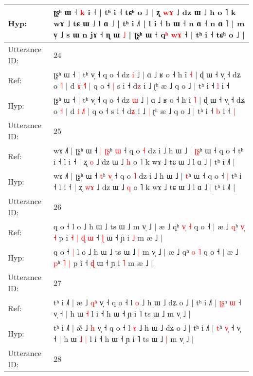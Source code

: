 \documentclass[10pt]{article}
\DeclareRobustCommand{\hl}[1]{{\textcolor{red}{#1}}}
\begin{document}
\begin{longtable}{ll}
 \\
Hyp: & ʈʂʰ ɯ ˧ \hl{k} i ˧ | tʰ i ˧ tɕʰ o ˩ | ʐ \hl{w}\hl{ɤ} ˩ dz ɯ ˩ h o ˥ k wɤ ˩ tɕ ɯ ˩ l ɑ ˩ | tʰ i ˩˥ | l i ˧ h ɯ ˧ n ɑ ˧ n ɑ ˥ | m v̩ ˩ s ɯ\hl{}\hl{} n jɤ ˧ ɳ ɯ \hl{˩} | ʈʂʰ ɯ ˧ q\hl{ʰ} \hl{w}\hl{ɤ} ˧ | tʰ i ˧ tɕʰ o ˩ |
 \\
\midrule
Utterance ID: & 24 \\
Ref: & ʈʂʰ ɯ ˧ | tʰ v̩ ˧ q o ˧ dz \hl{i} ˩ | ɑ ˩ ʁ o ˧ h ĩ \hl{˧} | ɖ ɯ ˧ v̩ ˧ dʑ o \hl{˥} | d \hl{ɤ} \hl{˧}˥ | q o ˧\hl{ }\hl{|} s i ˧ d\hl{z} i ˩\hl{}\hl{} ʈʰ æ ˩ q o ˩ | tʰ i ˧ \hl{l} i ˧\hl{}\hl{}
 \\
Hyp: & ʈʂʰ ɯ ˧ | tʰ v̩ ˧ q o ˧ dz \hl{ɯ} ˩ | ɑ ˩ ʁ o ˧ h ĩ \hl{˥} | ɖ ɯ ˧ v̩ ˧ dʑ o \hl{˧} | d \hl{i} \hl{˩}˥ | q o ˧\hl{}\hl{} s i ˧ d\hl{ʑ} i ˩\hl{ }\hl{|} ʈʰ æ ˩ q o ˩ | tʰ i ˧ \hl{b} i ˧\hl{ }\hl{|}
 \\
\midrule
Utterance ID: & 25 \\
Ref: & wɤ ˩˥ | ʈʂʰ ɯ ˧\hl{ }\hl{|} \hl{ʈ}\hl{ʂ}ʰ \hl{}\hl{ɯ} ˧ q o \hl{˧} dz i ˩ h ɯ ˩ | \hl{ʈ}\hl{ʂ}ʰ ɯ ˧ q o ˧\hl{}\hl{} tʰ i ˧ l i ˧ | ʐ \hl{}\hl{o} ˩ dz ɯ ˩ \hl{h} o ˥ k wɤ ˩ tɕ ɯ ˩ l ɑ ˩ | tʰ i ˩˥ |
 \\
Hyp: & wɤ ˩˥ | ʈʂʰ ɯ ˧\hl{}\hl{} \hl{}\hl{t}ʰ \hl{v}\hl{̩} ˧ q o \hl{˥} dz i ˩ h ɯ ˩ | \hl{}\hl{t}ʰ ɯ ˧ q o ˧\hl{ }\hl{|} tʰ i ˧ l i ˧ | ʐ \hl{w}\hl{ɤ} ˩ dz ɯ ˩ \hl{q} o ˥ k wɤ ˩ tɕ ɯ ˩ l ɑ ˩ | tʰ i ˩˥ |
 \\
\midrule
Utterance ID: & 26 \\
Ref: & q o ˧\hl{}\hl{} l o ˩ h ɯ ˩ ts ɯ ˩\hl{}\hl{} m v̩ ˩ | æ ˩ qʰ \hl{v}\hl{̩} \hl{˧} q o ˧ | æ ˩ \hl{q}ʰ \hl{v}\hl{̩} \hl{˧} p i\hl{ }\hl{˧}\hl{ }\hl{|}\hl{ }\hl{ɖ}\hl{ }\hl{ɯ} ˧ \hl{ɭ} ɯ ˧ ɲ i \hl{˩} m æ ˩ |
 \\
Hyp: & q o ˧\hl{ }\hl{|} l o ˩ h ɯ ˩ ts ɯ ˩\hl{ }\hl{|} m v̩ ˩ | æ ˩ qʰ \hl{}\hl{o} \hl{˥} q o ˧ | æ ˩ \hl{p}ʰ \hl{}\hl{˥} \hl{|} p i\hl{}\hl{}\hl{}\hl{}\hl{}\hl{}\hl{}\hl{̃} ˧ \hl{ɖ} ɯ ˧ ɲ i \hl{˥} m æ ˩ |
 \\
\midrule
Utterance ID: & 27 \\
Ref: & tʰ i ˩˥ | æ\hl{} ˩ \hl{q}\hl{ʰ} v̩ ˧ q o ˧ l \hl{o} ˩ h ɯ ˩ dʑ o ˩ | tʰ i ˩˥ | \hl{ʈ}\hl{ʂ}ʰ \hl{}\hl{ɯ} ˧ v̩ ˧ | h ɯ\hl{}\hl{} \hl{˧} l i ˧ h ɯ ˧ ɲ i ˥ ts ɯ ˩\hl{}\hl{} m v̩ ˩ |
 \\
Hyp: & tʰ i ˩˥ | æ\hl{̃} ˩ \hl{}\hl{h} v̩ ˧ q o ˧ l \hl{ɤ} ˩ h ɯ ˩ dʑ o ˩ | tʰ i ˩˥ | \hl{}\hl{t}ʰ \hl{v}\hl{̩} ˧ v̩ ˧ | h ɯ\hl{ }\hl{˩} \hl{|} l i ˧ h ɯ ˧ ɲ i ˥ ts ɯ ˩\hl{ }\hl{|} m v̩ ˩ |
 \\
\midrule
Utterance ID: & 28 \\

\end{longtable}
\end{document}
